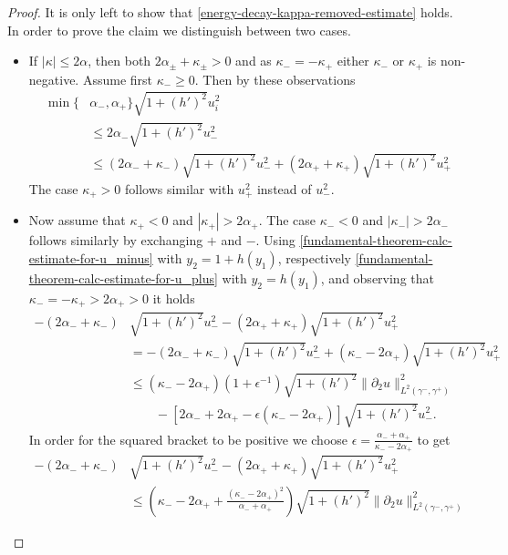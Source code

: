 \documentclass{article}
\theoremstyle{definition}
\theoremstyle{definition}
\begin{document}
\begin{proof}
It is only left to show that \eqref{energy-decay-kappa-removed-estimate} holds. In order to prove the claim we distinguish between two cases.
\begin{itemize}
    \item
    If $|\kappa| \leq 2\alpha$, then both $2\alpha_\pm+\kappa_\pm>0$ and as $\kappa_-=-\kappa_+$ either $\kappa_-$ or $\kappa_+$ is non-negative. Assume first $\kappa_-\geq 0$. Then by these observations
    \begin{align*}
        \min\lbrace&\alpha_-,\alpha_+\rbrace\sqrt{1+(h')^2}u_{i}^2 
        \\&\leq 2\alpha_- \sqrt{1+(h')^2}u_{-}^2 
        \\
        &\leq (2\alpha_- + \kappa_-) \sqrt{1+(h')^2}u_{-}^2 + (2\alpha_+ + \kappa_+) \sqrt{1+(h')^2}u_{+}^2
    \end{align*}
    The case $\kappa_+>0$ follows similar with $u_+^2$ instead of $u_-^2$.
    \item
    Now assume that $\kappa_+<0$ and $|\kappa_+|>2\alpha_+$. The case $\kappa_-<0$ and $|\kappa_-|>2\alpha_-$ follows similarly by exchanging $+$ and $-$. Using \eqref{fundamental-theorem-calc-estimate-for-u_minus} with $y_2 = 1 + h(y_1)$, respectively \eqref{fundamental-theorem-calc-estimate-for-u_plus} with $y_2 = h(y_1)$, and observing that $\kappa_-=-\kappa_+>2\alpha_+>0$ it holds
    \begin{align*}
        - (2\alpha_-+\kappa_-)&\sqrt{1+(h')^2}u_-^2 -(2\alpha_++\kappa_+)\sqrt{1+(h')^2}u_+^2
        \\
        &= - (2\alpha_-+\kappa_-)\sqrt{1+(h')^2}u_-^2 + (\kappa_--2\alpha_+)\sqrt{1+(h')^2}u_+^2
        \\
        &\leq (\kappa_--2\alpha_+)(1+\epsilon^{-1})\sqrt{1+(h')^2}\|\partial_2 u\|_{L^2(\gamma^-,\gamma^+)}^2
        \\
        &\qquad - \left[2\alpha_-+2\alpha_+-\epsilon(\kappa_--2\alpha_+)\right]\sqrt{1+(h')^2}u_-^2.
    \end{align*}
    In order for the squared bracket to be positive we choose $\epsilon = \frac{\alpha_-+\alpha_+}{\kappa_--2\alpha_+}$ to get
    \begin{align*}
        - (2\alpha_-+\kappa_-)&\sqrt{1+(h')^2}u_-^2 -(2\alpha_++\kappa_+)\sqrt{1+(h')^2}u_+^2
        \\
        &\leq \left(\kappa_--2\alpha_+ + \frac{(\kappa_- - 2 \alpha_+)^2}{\alpha_- + \alpha_+}\right)\sqrt{1+(h')^2}\|\partial_2 u\|_{L^2(\gamma^-,\gamma^+)}^2

\end{align*}
\end{itemize}
\end{proof}
\end{document}
